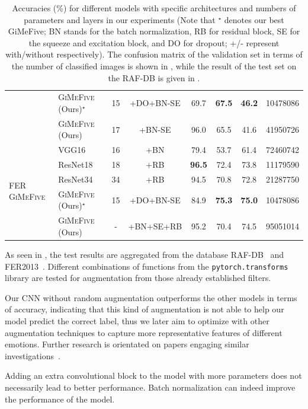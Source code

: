 \begin{table}[ht]
\begin{tabular}{@{}llcccccr@{}}
    &\textsc{GiMeFive} (Ours)\textcolor{LMUGreen}{$^\star$} & 15 & +DO+BN-SE & 69.7 & \textbf{67.5} & \textbf{46.2} & 10478086 \\
    &\textsc{GiMeFive} (Ours) & 17 & +BN-SE & 96.0 & 65.5 & 41.6 & 41950726 \\
    \midrule
    \midrule
    \multirow{5}{*}{FER \textsc{GiMeFive}} & VGG16~\cite{SimonyanZ14a} & 16 & +BN & 79.4 & 53.7 & 61.4 & 72460742 \\
    & ResNet18~\cite{HeZRS16} & 18 & +RB  & \textbf{96.5} & 72.4 & 73.8 & 11179590 \\
    & ResNet34~\cite{HeZRS16} & 34 & +RB  & 94.5 & 70.8 & 72.8 & 21287750 \\
    &\textsc{GiMeFive} (Ours)\textcolor{LMUGreen}{$^\star$} & 15 & +DO+BN-SE & 84.9 & \textbf{75.3} & \textbf{75.0} & 10478086 \\
    &\textsc{GiMeFive} (Ours) & - & +BN+SE+RB & 95.2 & 70.4 & 74.5 & 95051014 \\
    \bottomrule
  \end{tabular}
  \caption{Accuracies (\%) for different models with specific architectures and numbers of parameters and layers in our experiments 
  (Note that \textcolor{LMUGreen}{$^\star$} denotes our best GiMeFive; 
  BN stands for the batch normalization, 
  RB for residual block, 
  SE for the squeeze and excitation block, 
  and DO for dropout; 
  +/- represent with/without respectively). 
  The confusion matrix of the validation set in terms of the number of classified images is shown in , 
  while the result of the test set on the RAF-DB is given in .} 
  \label{tab:model}
\end{table}

As seen in , 
the test results are aggregated from the database RAF-DB~\cite{kaggle_rafdb} and FER2013~\cite{kaggle_fer}.
Different combinations of functions from the \texttt{pytorch.transforms} library are tested for augmentation from those already established filters. 

Our CNN without random augmentation outperforms the other models in terms of accuracy, 
indicating that this kind of augmentation is not able to help our model predict the correct label, 
thus we later aim to optimize with other augmentation techniques to capture more representative features of different emotions.
Further research is orientated on papers engaging similar investigations~\cite{ZeilerF14,li_reliable_2017,VermaMRMV23}.

Adding an extra convolutional block to the model with more parameters does not necessarily lead to better performance.
Batch normalization can indeed improve the performance of the model. 

